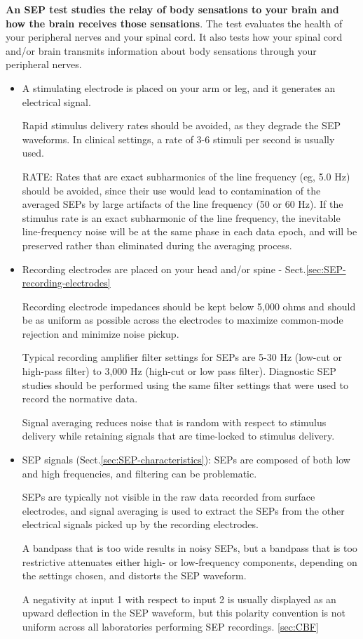 {\bf An SEP test studies the relay of body sensations to your brain and how the
brain receives those sensations}.  The test evaluates the health of your
peripheral nerves and your spinal cord. It also tests how your spinal cord
and/or brain transmits information about body sensations through your peripheral
nerves.   
\begin{itemize}
  \item  A stimulating electrode is placed on your arm
or leg, and it generates an electrical signal. 
  
Rapid stimulus delivery rates should be avoided, as they degrade the SEP
waveforms. In clinical settings, a rate of 3-6 stimuli per second is usually used. 

RATE: Rates that are exact subharmonics of the line frequency (eg, 5.0 Hz)
should be avoided, since their use would lead to contamination of the averaged
SEPs by large artifacts of the line frequency (50 or 60 Hz). If the stimulus
rate is an exact subharmonic of the line frequency, the inevitable
line-frequency noise will be at the same phase in each data epoch, and will be
preserved rather than eliminated during the averaging process.

  \item  Recording electrodes are placed on your head and/or spine -
  Sect.\ref{sec:SEP-recording-electrodes}

Recording electrode impedances should be kept below 5,000 ohms and should be as
uniform as possible across the electrodes to maximize common-mode rejection and
minimize noise pickup.  

Typical recording amplifier filter settings for SEPs are 5-30 Hz (low-cut or
high-pass filter) to 3,000 Hz (high-cut or low pass filter). Diagnostic SEP
studies should be performed using the same filter settings that were used to
record the normative data.

Signal averaging reduces noise that is random with respect to stimulus delivery
while retaining signals that are time-locked to stimulus delivery.

   \item SEP signals (Sect.\ref{sec:SEP-characteristics}):  
   SEPs are composed of both low and high frequencies, and filtering can be
   problematic. 

SEPs are typically not visible in the raw data recorded from surface electrodes,
and signal averaging is used to extract the SEPs from the other electrical
signals picked up by the recording electrodes.

A bandpass that is too wide results in noisy SEPs, but a bandpass that is too
   restrictive attenuates either high- or low-frequency components, depending on
   the settings chosen, and distorts the SEP waveform.
   
A negativity at input 1 with respect to input 2 is usually displayed as an
   upward deflection in the SEP waveform, but this polarity convention is not
   uniform across all laboratories performing SEP recordings. 
      \ref{sec:CBF}
\end{itemize}

